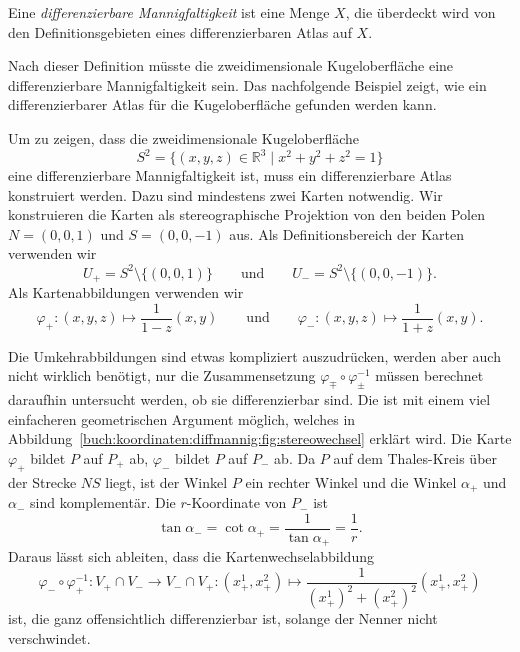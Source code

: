 \begin{definition}
Eine {\em differenzierbare Mannigfaltigkeit} ist eine Menge $X$, die überdeckt
wird von den Definitionsgebieten eines differenzierbaren Atlas auf $X$.
%
%
\end{definition}

Nach dieser Definition müsste die zweidimensionale Kugeloberfläche eine
differenzierbare Mannigfaltigkeit sein.
Das nachfolgende Beispiel zeigt, wie ein differenzierbarer Atlas
für die Kugeloberfläche gefunden werden kann.

\begin{beispiel}
%
Um zu zeigen, dass die zweidimensionale Kugeloberfläche
\[
S^2
=
\{
(x,y,z)\in\mathbb{R}^3
\mid
x^2 + y^2 + z^2 = 1
\}
\]
eine differenzierbare Mannigfaltigkeit ist, muss ein differenzierbare
Atlas konstruiert werden.
Dazu sind mindestens zwei Karten notwendig.
Wir konstruieren die Karten als stereographische Projektion von den
beiden Polen $N=(0,0,1)$ und $S=(0,0,-1)$ aus.
Als Definitionsbereich der Karten verwenden wir
\[
U_+
=
S^2\setminus \{ (0,0,1)\}
\qquad\text{und}\qquad
U_-
=
S^2\setminus \{ (0,0,-1)\}.
\]
Als Kartenabbildungen verwenden wir
\[
\varphi_+
\colon
(x,y,z)
\mapsto
\frac{1}{1-z}
(x,y)
\qquad\text{und}\qquad
\varphi_-
\colon
(x,y,z)
\mapsto
\frac{1}{1+z}
(x,y).
\]



Die Umkehrabbildungen sind etwas kompliziert auszudrücken, werden
aber auch nicht wirklich benötigt, nur die Zusammensetzung
$\varphi_{\mp}\circ\varphi_{\pm}^{-1}$ müssen berechnet daraufhin
untersucht werden, ob sie differenzierbar sind.
%
Die ist mit einem viel einfacheren geometrischen Argument möglich,
welches in Abbildung~\ref{buch:koordinaten:diffmannig:fig:stereowechsel}
erklärt wird.
Die Karte $\varphi_+$ bildet $P$ auf $P_+$ ab, $\varphi_-$ bildet
$P$ auf $P_-$ ab.
Da $P$ auf dem Thales-Kreis über der Strecke $NS$ liegt, ist der Winkel
$P$ ein rechter Winkel und die Winkel $\alpha_+$ und $\alpha_-$ sind
komplementär.
Die $r$-Koordinate von $P_-$ ist 
\[
\tan \alpha_-
=
\cot \alpha_+
=
\frac1{\tan\alpha_+}
=
\frac1{r}.
\]
Daraus lässt sich ableiten, dass die Kartenwechselabbildung
\[
\varphi_-\circ\varphi_+^{-1}
\colon
V_+\cap V_- \to V_-\cap V_+
:
(x^1_+,x^2_+)
\mapsto
\frac{1}{(x_+^1)^2 + (x_+^2)^2}(x_+^1,x_+^2)
\]
ist, die ganz offensichtlich differenzierbar ist, solange der 
Nenner nicht verschwindet.
\end{beispiel}

